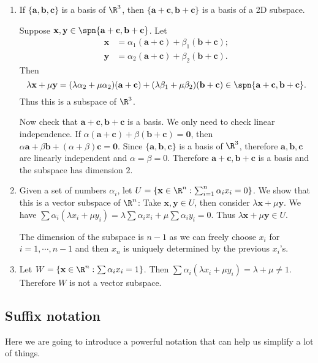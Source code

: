 \documentclass[a4paper]{article}
\begin{document}
\begin{eg}\leavevmode
  \begin{enumerate}
    \item If $\{\mathbf{a, b, c}\}$ is a basis of $\R^3$, then $\{\mathbf{a + c, b + c}\}$ is a basis of a 2D subspace.

      Suppose $\mathbf{x, y}\in \spn\{\mathbf{a + c, b + c}\}$. Let
      \begin{align*}
        \mathbf{x} &= \alpha_1(\mathbf{a + c}) + \beta_1(\mathbf{b + c});\\
        \mathbf{y} &= \alpha_2(\mathbf{a + c}) + \beta_2(\mathbf{b + c}).
      \end{align*}
      Then
      \[
        \lambda\mathbf{x} + \mu\mathbf{y} = (\lambda\alpha_2+\mu\alpha_2)(\mathbf{a + c}) + (\lambda\beta_1 + \mu\beta_2)\mathbf{(b + c)}\in\spn\{\mathbf{a + c, b + c}\}.
      \]
      Thus this is a subspace of $\R^3$.

      Now check that $\mathbf{a + c, b + c}$ is a basis. We only need to check linear independence. If $\alpha(\mathbf{a + c}) + \beta(\mathbf{b + c}) = \mathbf{0}$, then $\alpha\mathbf{a} + \beta\mathbf{b} + (\alpha + \beta)\mathbf{c} = \mathbf{0}$. Since $\{\mathbf{a, b, c}\}$ is a basis of $\R^3$, therefore $\mathbf{a, b, c}$ are linearly independent and $\alpha = \beta = 0$. Therefore $\mathbf{a + c, b + c}$ is a basis and the subspace has dimension $2$.
    \item Given a set of numbers $\alpha_i$, let $U = \{\mathbf{x}\in \R^n: \sum_{i=1}^n \alpha_ix_i = 0\}$. We show that this is a vector subspace of $\R^n$: Take $\mathbf{x, y}\in U$, then consider $\lambda\mathbf{x} + \mu\mathbf{y}$. We have $\sum\alpha_i(\lambda x_i + \mu y_i) = \lambda\sum\alpha_ix_i + \mu\sum\alpha_iy_i = 0$. Thus $\lambda\mathbf{x} + \mu\mathbf{y} \in U$.

      The dimension of the subspace is $n-1$ as we can freely choose $x_i$ for $i = 1, \cdots, n - 1$ and then $x_n$ is uniquely determined by the previous $x_i$'s.
    \item Let $W = \{\mathbf{x}\in \R^n: \sum \alpha_ix_i = 1\}$. Then $\sum\alpha_i(\lambda x_i + \mu y_i) = \lambda + \mu \not= 1$. Therefore $W$ is not a vector subspace.
  \end{enumerate}
\end{eg}

\subsection{Suffix notation}
Here we are going to introduce a powerful notation that can help us simplify a lot of things.
\end{document}
